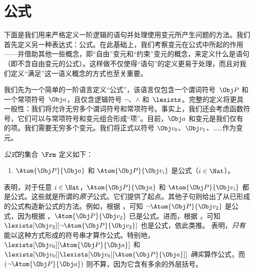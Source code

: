 \documentclass[../../../include/open-logic-section]{subfiles}
\begin{document}

\section{公式}


下面是我们用来严格定义一阶逻辑的语句并处理使用变元所产生问题的方法。我们首先定义另一种表达式：公式。在此基础上，我们考察变元在公式中所起的作用——并借助其他一些概念，即“自由”变元和“约束”变元的概念，来定义什么是语句（即不含自由变元的公式）。这样做不仅使得“语句”的定义更易于处理，而且对我们定义“满足”这一语义概念的方式也至关重要。

我们先为一个简单的一阶语言定义“公式”，该语言仅包含一个谓词符号~$\Obj P$ 和一个常项符号~$\Obj a$，且仅含逻辑符号 $\lnot$、$\land$ 和~$\lexists$。完整的定义将更具一般性：我们将允许无穷多个谓词符号和常项符号。事实上，我们还会考虑函数符号，它们可以与常项符号和变元组合形成“项”。目前，$\Obj a$ 和变元是我们仅有的项。我们需要无穷多个变元。我们将正式以符号 $\Obj v_0$、$\Obj v_1$、……作为变元。

\begin{defn}
\emph{公式}的集合~$\Frm$ 定义如下：
\begin{enumerate}
\item{} $\Atom{\Obj P}{\Obj a}$ 和 $\Atom{\Obj
  P}{\Obj v_i}$ 是公式（$i \in \Nat$）。




\end{enumerate}
\end{defn}

 表明，对于任意 $i \in \Nat$，$\Atom{\Obj P}{\Obj a}$ 和 $\Atom{\Obj P}{\Obj v_i}$ 都是公式。这些就是所谓的\emph{原子}公式。它们提供了起点。其他子句则给出了从已形成的公式构造新公式的方法。例如，根据 ，可知 $\lnot \Atom{\Obj P}{\Obj v_2}$ 是公式，因为根据 ，$\Atom{\Obj P}{\Obj v_2}$ 已是公式。进而，根据 ，可知 $\lexists[\Obj v_2][\lnot \Atom{\Obj P}{\Obj v_2}]$ 也是公式，依此类推。 表明，\emph{只有}能以这种方式形成的符号串才算作公式。特别地，$\lexists[\Obj v_0][\Atom{\Obj P}{\Obj a}]$ 和 $\lexists[\Obj
  v_0][\lexists[\Obj v_0][\Atom{\Obj P}{\Obj a}]]$ \emph{确实}算作公式，而 $(\lnot \Atom{\Obj P}{\Obj a})$ 则不算，因为它含有多余的外层括号。
\end{document}

